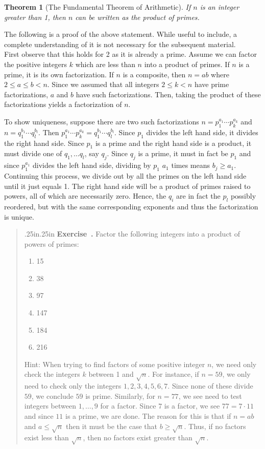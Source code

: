 \documentclass[12 pt]{article}
\newtheorem{theorem}{Theorem}
\newcounter{exercise}[section]
\newenvironment{exercise}{\refstepcounter{exercise}\par\bigskip \begin{quotation}{}{\leftmargin .25in\rightmargin .25in}
	\noindent \textbf{Exercise~\thesection.\theexercise }  \rmfamily}{\end{quotation}\par\bigskip}
\begin{document}
\begin{theorem}[The Fundamental Theorem of Arithmetic]
If $n$ is an integer greater than 1, then $n$ can be written  as the product of primes.
\end{theorem}


The following is a proof of the above statement.  While useful to include, a complete understanding of it is not necessary for the subsequent material. 
\\

First observe that this holds for 2 as it is already a prime.  Assume we can factor the positive integers $k$ which are less than $n$ into a product of primes.  If $n$ is a prime, it is its own factorization.  If $n$ is a composite, then $n = ab$ where $2 \leq a \leq b < n$. Since we assumed that all integers $2 \leq k < n$ have prime factorizations, $a$ and $b$ have such factorizations.  Then, taking the product of these factorizations yields a factorization of $n$.

To show uniqueness, suppose there are two such factorizations $n = p_1^{a_1}\cdots p_k^{a_k}$ and $n = q_1^{b_1}\cdots q_l^{b_l}$.  Then $p_1^{a_1}\cdots p_k^{a_k} = q_1^{b_1}\cdots q_l^{b_l}$.  Since $p_1$ divides the left hand side, it divides the right hand side.  Since $p_1$ is a prime and the right hand side is a product, it must divide one of $q_1, \dots q_l$, say $q_j$. Since $q_j$ is a prime, it must in fact be $p_1$ and since $p_1^{a_1}$ divides the left hand side, dividing by $p_1$ $a_1$ times means $b_j \geq a_1$.  Continuing this process, we divide out by all the primes on the left hand side until it just equals 1.  The right hand side will be a product of primes raised to powers, all of which are necessarily zero. Hence, the $q_i$ are in fact the $p_l$ possibly reordered, but with the same corresponding exponents and thus the factorization is unique.  

\begin{exercise}
Factor the following integers into a product of powers of primes:

\begin{enumerate}
\item 15
\item 38
\item 97
\item 147
\item 184
\item 216
\end{enumerate}

Hint: When trying to find factors of some positive integer $n$, we need only check the integers $k$ between 1 and $\sqrt{n}$.  For instance, if $n = 59$, we only need to check only the integers $1,2,3,4,5,6,7$.  Since none of these divide $59$, we conclude $59$ is prime. Similarly, for $n = 77$, we see need to test integers between $1, \dots, 9$ for a factor.  Since $7$ is a factor, we see $77 = 7 \cdot 11$ and since $11$ is a prime, we are done. The reason for this is that if $n = ab$ and $a \leq \sqrt{n}$ then it must be the case that $b \geq \sqrt{n}$.  Thus, if no factors exist less than $\sqrt{n}$, then no factors exist greater than $\sqrt{n}$.

\end{exercise}
\end{document}
